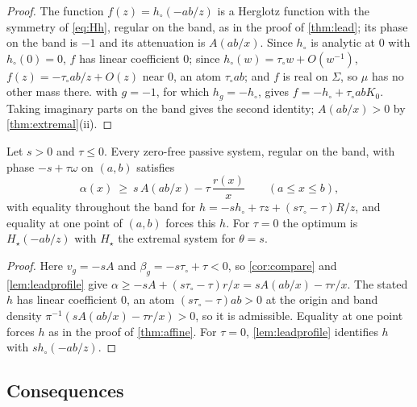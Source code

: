 \begin{proof}
The function $f(z)=h_\circ(-ab/z)$ is a Herglotz function with the symmetry
of \eqref{eq:Hh}, regular on the band, as in the proof of \cref{thm:lead};
its phase on the band is $-1$ and its attenuation is $A(ab/x)$. Since
$h_\circ$ is analytic at $0$ with $h_\circ(0)=0$, $f$ has linear coefficient
$0$; since $h_\circ(w)=\tau_\circ w+O(w^{-1})$, $f(z)=-\tau_\circ ab/z+O(z)$
near $0$, an atom $\tau_\circ ab$; and $f$ is real on $\Sigma$, so $\mu$ has
no other mass there.  with $g=-1$, for which
$h_g=-h_\circ$, gives $f=-h_\circ+\tau_\circ abK_0$. Taking imaginary parts
on the band gives the second identity; $A(ab/x)>0$ by \cref{thm:extremal}(ii).
\end{proof}

\begin{theorem}\label{thm:leadpoint}
Let $s>0$ and $\tau\le0$. Every zero-free passive system, regular on the
band, with phase $-s+\tau\omega$ on $(a,b)$ satisfies
\[
\alpha(x)\ \ge\ s\,A(ab/x)-\tau\,\frac{r(x)}x\qquad(a\le x\le b),
\]
with equality throughout the band for
$h=-sh_\circ+\tau z+(s\tau_\circ-\tau)R/z$, and equality at one point of
$(a,b)$ forces this $h$. For $\tau=0$ the optimum is $H_\star(-ab/z)$ with
$H_\star$ the extremal system for $\theta=s$.
\end{theorem}

\begin{proof}
Here $v_g=-sA$ and $\beta_g=-s\tau_\circ+\tau<0$, so \cref{cor:compare} and
\cref{lem:leadprofile} give $\alpha\ge-sA+(s\tau_\circ-\tau)r/x
=sA(ab/x)-\tau r/x$. The stated $h$ has linear coefficient $0$, an atom
$(s\tau_\circ-\tau)ab>0$ at the origin and band density
$\pi^{-1}(sA(ab/x)-\tau r/x)>0$, so it is admissible. Equality at one point
forces $h$ as in the proof of \cref{thm:affine}. For $\tau=0$,
\cref{lem:leadprofile} identifies $h$ with $sh_\circ(-ab/z)$.
\end{proof}

\subsection{Consequences}

